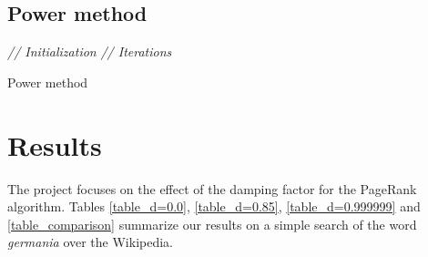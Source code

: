 \documentclass[pdftex,12pt,a4paper]{article}
\begin{document}
\subsection{Power method}
\IncMargin{1em}
\begin{algorithm}[H]
\BlankLine
\Indm
{}
\Indp
\BlankLine
\emph{// Initialization}\;
\emph{// Iterations}\;
\BlankLine
\caption{Power method}\label{algo_power_method}
\end{algorithm}
\DecMargin{1em}

\section{Results}

The project focuses on the effect of the damping factor for the PageRank algorithm. Tables \ref{table_d=0.0}, \ref{table_d=0.85}, \ref{table_d=0.999999} and \ref{table_comparison} summarize our results on a simple search of the word \emph{germania} over the Wikipedia.
\end{document}
